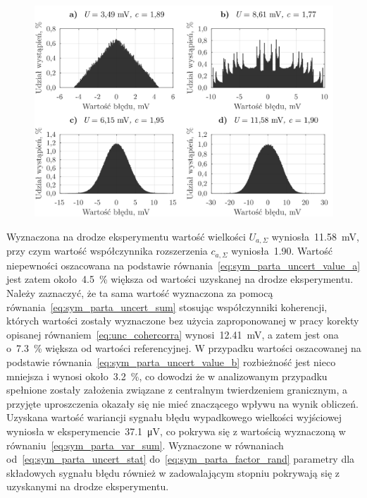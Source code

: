\begin{figure}[htb!]
\includegraphics{obrazki/hist_part_a}
\end{figure}

Wyznaczona na drodze eksperymentu wartość wielkości $U_{a,\Sigma}$ wyniosła~\qty{11.58}{mV}, przy czym wartość współczynnika rozszerzenia $c_{a,\Sigma}$ wyniosła~\num{1.90}. Wartość niepewności oszacowana na podstawie równania~\eqref{eq:sym_parta_uncert_value_a} jest zatem około~\qty{4.5}{\percent} większa od wartości uzyskanej na drodze eksperymentu. Należy zaznaczyć, że ta sama wartość wyznaczona za pomocą równania~\eqref{eq:sym_parta_uncert_sum} stosując współczynniki koherencji, których wartości zostały wyznaczone bez użycia zaproponowanej w pracy korekty opisanej równaniem~\eqref{eq:unc_cohercorra} wynosi~\qty{12.41}{mV}, a zatem jest ona o~\qty{7.3}{\percent} większa od wartości referencyjnej. W przypadku wartości oszacowanej na podstawie równania~\eqref{eq:sym_parta_uncert_value_b} rozbieżność jest nieco mniejsza i wynosi około~\qty{3.2}{\percent}, co dowodzi że w analizowanym przypadku spełnione zostały założenia związane z centralnym twierdzeniem granicznym, a przyjęte uproszczenia okazały się nie mieć znaczącego wpływu na wynik obliczeń. Uzyskana wartość wariancji sygnału błędu wypadkowego wielkości wyjściowej wyniosła w eksperymencie~\qty{37.1}{\micro V}, co pokrywa się z wartością wyznaczoną w równaniu~\eqref{eq:sym_parta_var_sum}. Wyznaczone w równaniach od~\eqref{eq:sym_parta_uncert_stat} do~\eqref{eq:sym_parta_factor_rand} parametry dla składowych sygnału błędu również w zadowalającym stopniu pokrywają się z uzyskanymi na drodze eksperymentu.

